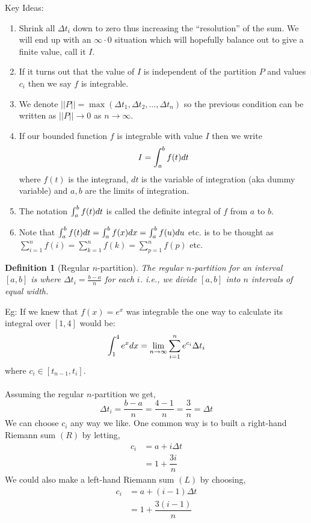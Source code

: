 \documentclass[10pt]{article}
\theoremstyle{break}
\newtheorem{defn}{Definition}[subsection]
\begin{document}
Key Ideas:
\begin{enumerate}
    \item Shrink all $\Delta t_i$ down to zero thus increasing the “resolution” of the sum. We will end up with an $\infty \cdot 0$ situation which will hopefully balance out to give a finite value, call it $I$.
    \item If it turns out that the value of $I$ is independent of the partition $P$ and values $c_i$ then we say $f$ is integrable.
    \item We denote $||P|| = \max(\Delta t_1, \Delta t_2, \dots, \Delta t_n)$ so the previous condition can be written as $||P|| \to 0$ as $n \to \infty$.
    \item If our bounded function $f$ is integrable with value $I$ then we write $$I = \int^b_a f(t) \space dt$$ where $f(t)$ is the integrand, $dt $ is the variable of integration (aka dummy variable) and $a, b$ are the limits of integration.
    \item The notation $\int^b_a f(t) \space dt$ is called the definite integral of $f$ from $a$ to $b$.
    \item Note that $\int^b_a f(t) \space dt  = \int^b_a f(x) \space dx = \int^b_a f(u) \space du $  etc. is to be thought as $\sum^{n}_{i=1}f(i) = \sum^{n}_{k=1}f(k) = \sum^{n}_{p=1}f(p)$ etc.
\end{enumerate}
\begin{defn}[Regular $n$-partition]
The regular $n$-partition for an interval $[a, b]$ is where $\Delta t_i = \frac{b-a}{n}$ for each $i$. 
i.e., we divide $[a, b]$ into $n$ intervals of equal width.
\end{defn}
Eg: If we knew that $f(x) = e^x$ was integrable the one way to calculate its integral over $[1, 4]$ would be: $$\int^4_1 e^x \space dx = \lim_{n \to \infty} \sum^n_{i=1} e^{c_i}\Delta t_i$$ where $c_i \in [t_{n-1}, t_i]$. \\ \space \\
Assuming the regular $n$-partition we get, $$\Delta t_i = \dfrac{b-a}{n} = \dfrac{4-1}{n} = \dfrac{3}{n} = \Delta t$$ We can choose $c_i$ any way we like. One common way is to built a right-hand Riemann sum $(R)$ by letting, 
\begin{align*}
    c_i &= a + i \Delta t \\
    &= 1 + \dfrac{3i}{n}
\end{align*}
We could also make a left-hand Riemann sum $(L)$ by choosing,
\begin{align*}
    c_i &= a + (i-1) \Delta t\\
    &= 1 + \dfrac{3(i-1)}{n}
\end{align*}
\end{document}
